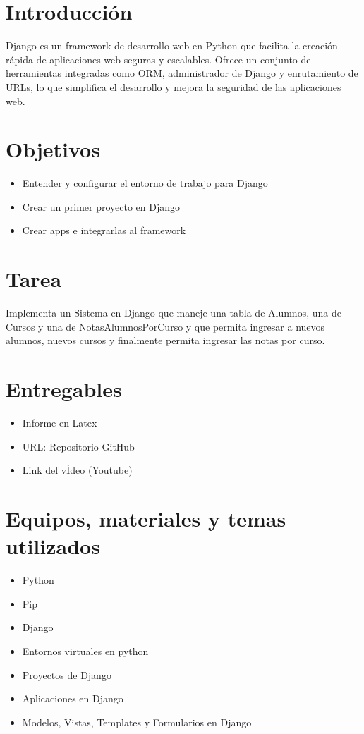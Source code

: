 \documentclass{article}
\begin{document}
  \section{Introducción}
  Django es un framework de desarrollo web en Python que facilita la creación rápida de aplicaciones web seguras y escalables.
  Ofrece un conjunto de herramientas integradas como ORM, administrador de Django y enrutamiento de URLs, lo que simplifica el 
  desarrollo y mejora la seguridad de las aplicaciones web.


  \section{Objetivos}
  \begin{itemize}
    \item Entender y configurar el entorno de trabajo para Django
    \item Crear un primer proyecto en Django
    \item Crear apps e integrarlas al framework
  \end{itemize}

 
	\section{Tarea}
  Implementa un Sistema en Django que maneje una tabla de Alumnos, una de Cursos y una de NotasAlumnosPorCurso y que 
  permita ingresar a nuevos alumnos, nuevos cursos y finalmente permita ingresar las notas por curso.
  \newpage
 
 
  \section{Entregables}
  \begin{itemize}
    \item Informe en Latex
    \item URL: Repositorio GitHub
    \item Link del vÍdeo (Youtube)
  \end{itemize}
  
		
	\section{Equipos, materiales y temas utilizados}
  \begin{itemize}
    \item Python
    \item Pip
    \item Django
    \item Entornos virtuales en python
    \item Proyectos de Django
    \item Aplicaciones en Django
    \item Modelos, Vistas, Templates y Formularios en Django
  \end{itemize}
 
\end{document}
